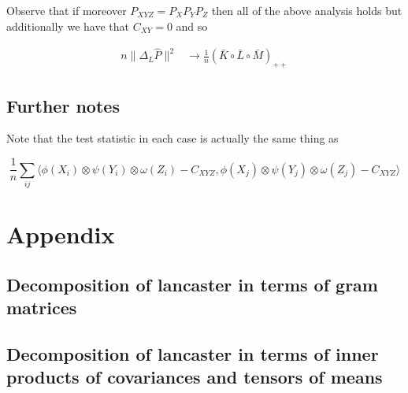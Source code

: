 \documentclass{article}
\begin{document}
Observe that if moreover $P_{XYZ} = P_XP_YP_Z$ then all of the above analysis holds but additionally we have that $C_{XY} = 0$ and so 

\begin{align*}
n\|\Delta_L \hat{P}\|^2 &\longrightarrow \frac{1}{n}(\bar{K}\circ \bar{L} \circ \bar{M})_{++}
\end{align*}

\subsection*{Further notes}

Note that the test statistic in each case is actually the same thing as

\[
\frac{1}{n} \sum_{ij} \langle\phi(X_i)\otimes \psi(Y_i) \otimes\omega(Z_i) - C_{XYZ}, \phi(X_j)\otimes \psi(Y_j)\otimes\omega(Z_j) - C_{XYZ}\rangle
\]

\section{Appendix}
\subsection{Decomposition of lancaster in terms of gram matrices}
\subsection{Decomposition of lancaster in terms of inner products of covariances and tensors of means}
\end{document}

